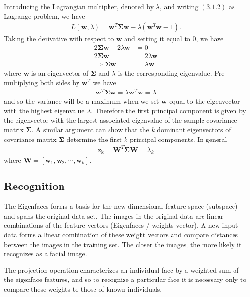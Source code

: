 Introducing the Lagrangian multiplier, denoted by $\lambda$, and writing $(3.1.2)$ as Lagrange problem, we have \begin{align*}
L(\mathbf{w}, \lambda)= \mathbf{w}^T \mathbf{\Sigma}\mathbf{w}-\lambda (\mathbf{w}^T\mathbf{w}-1).
\end{align*}
Taking the derivative with respect to $\mathbf{w}$ and setting it equal to $0$, we have \begin{align*}
2\mathbf{\Sigma}\mathbf{w} - 2\lambda \mathbf{w} &=0\\
2\mathbf{\Sigma}\mathbf{w} &= 2\lambda \mathbf{w}\\
\Longrightarrow \mathbf{\Sigma}\mathbf{w} &= \lambda \mathbf{w}
\end{align*}
where $\mathbf{w}$ is an eigenvector of $\mathbf{\Sigma}$ and $\lambda$ is the corresponding eigenvalue.
Pre-multiplying both sides by $\mathbf{w}^T$ we have \begin{align*}
\mathbf{w}^T \mathbf{\Sigma}\mathbf{w} = \lambda \mathbf{w}^T\mathbf{w} = \lambda
\end{align*}
and so the variance will be a maximum when we set $\mathbf{w}$ equal to the eigenvector with the highest eigenvalue $\lambda$. Therefore the first principal component is given by the eigenvector with the largest associated eigenvalue of the sample covariance matrix $\mathbf{\Sigma}$. A similar argument can show that the $k$ dominant eigenvectors of covariance matrix $\mathbf{\Sigma}$ determine the first $k$ principal components. In general \begin{align*}
\mathrm{z_k} = \mathbf{W}^T\mathbf{\Sigma}\mathbf{W} = \lambda_k
\end{align*}
where $\mathbf{W}=[\mathbf{w}_1, \mathbf{w}_2, \cdots , \mathbf{w}_k]$.

\subsection{Recognition}
The Eigenfaces forms a basis for the new dimensional feature space (subspace) and spans the original data set. The images in the original data are linear combinations of the feature vectors (Eigenfaces / weights vector). A new input data forms a linear combination of these weight vectors and compare distances between the images in the training set. The closer the images, the more likely it recognizes as a facial image.

The projection operation characterizes an individual face by a weighted sum of the eigenface features, and so to recognize a particular face it is necessary only to compare these weights to those of known individuals.

